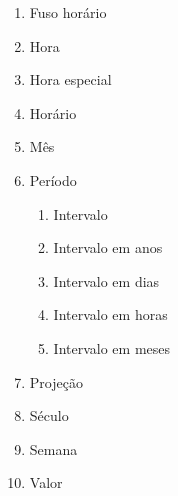 \begin{multicols}{2}
\begin{itemize}
\begin{enumerate}
			\item Fuso horário				
			\item Hora				
			\item Hora especial				
			\item Horário				
			\item Mês				
			\item Período	\begin{enumerate}			
					\item Intervalo		
					\item Intervalo em anos		
					\item Intervalo em dias		
					\item Intervalo em horas		
					\item Intervalo em meses	\end{enumerate}	
			\item Projeção				
			\item Século				
			\item Semana				
			\item Valor				
\end{enumerate} \end{itemize}
\end{multicols}
